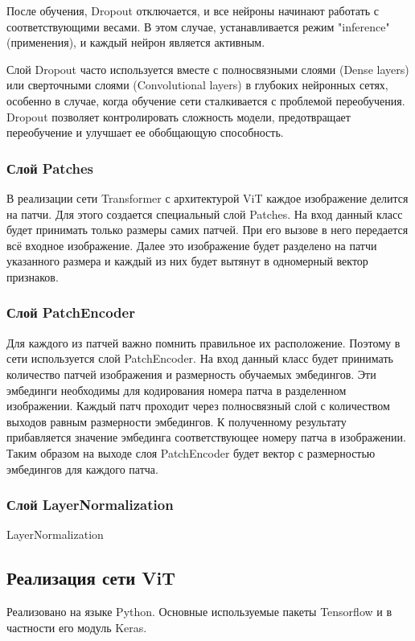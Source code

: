 \documentclass[14pt,a4paper]{extarticle}
\begin{document}
После обучения, Dropout отключается, и все нейроны начинают работать с соответствующими весами. В этом случае, устанавливается режим "inference" (применения), и каждый нейрон является активным.

Слой Dropout часто используется вместе с полносвязными слоями (Dense layers) или сверточными слоями (Convolutional layers) в глубоких нейронных сетях, особенно в случае, когда обучение сети сталкивается с проблемой переобучения. Dropout позволяет контролировать сложность модели, предотвращает переобучение и улучшает ее обобщающую способность.


\subsubsection*{Слой Patches}
В реализации сети Transformer с архитектурой ViT каждое изображение делится на патчи. Для этого создается специальный слой Patches. На вход данный класс будет принимать только размеры самих патчей. При его вызове в него передается всё входное изображение. Далее это изображение будет разделено на патчи указанного размера и каждый из них будет вытянут в одномерный вектор признаков.


\subsubsection*{Слой PatchEncoder}
Для каждого из патчей важно помнить правильное их расположение. Поэтому в сети используется слой PatchEncoder. На вход данный класс будет принимать количество патчей изображения и размерность обучаемых эмбедингов. Эти эмбединги необходимы для кодирования номера патча в разделенном изображении. Каждый патч проходит через полносвязный слой с количеством выходов равным размерности эмбедингов. К полученному результату прибавляется значение эмбединга соответствующее номеру патча в изображении. Таким образом на выходе слоя PatchEncoder будет вектор с размерностью эмбедингов для каждого патча.

\subsubsection*{Слой LayerNormalization}
LayerNormalization

\newpage
\subsection{Реализация сети ViT}
Реализовано на языке Python.
Основные используемые пакеты Tensorflow и в частности его модуль Keras.
\end{document}
